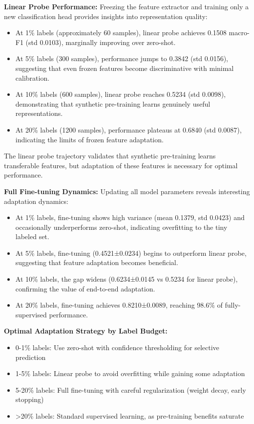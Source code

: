 \documentclass[journal]{IEEEtran}
\begin{document}
\textbf{Linear Probe Performance:} Freezing the feature extractor and training only a new classification head provides insights into representation quality:
\begin{itemize}
\item At 1\% labels (approximately 60 samples), linear probe achieves 0.1508 macro-F1 (std 0.0103), marginally improving over zero-shot.
\item At 5\% labels (300 samples), performance jumps to 0.3842 (std 0.0156), suggesting that even frozen features become discriminative with minimal calibration.
\item At 10\% labels (600 samples), linear probe reaches 0.5234 (std 0.0098), demonstrating that synthetic pre-training learns genuinely useful representations.
\item At 20\% labels (1200 samples), performance plateaus at 0.6840 (std 0.0087), indicating the limits of frozen feature adaptation.
\end{itemize}

The linear probe trajectory validates that synthetic pre-training learns transferable features, but adaptation of these features is necessary for optimal performance.

\textbf{Full Fine-tuning Dynamics:} Updating all model parameters reveals interesting adaptation dynamics:
\begin{itemize}
\item At 1\% labels, fine-tuning shows high variance (mean 0.1379, std 0.0423) and occasionally underperforms zero-shot, indicating overfitting to the tiny labeled set.
\item At 5\% labels, fine-tuning (0.4521±0.0234) begins to outperform linear probe, suggesting that feature adaptation becomes beneficial.
\item At 10\% labels, the gap widens (0.6234±0.0145 vs 0.5234 for linear probe), confirming the value of end-to-end adaptation.
\item At 20\% labels, fine-tuning achieves 0.8210±0.0089, reaching 98.6\% of fully-supervised performance.
\end{itemize}

\textbf{Optimal Adaptation Strategy by Label Budget:}
\begin{itemize}
\item 0-1\% labels: Use zero-shot with confidence thresholding for selective prediction
\item 1-5\% labels: Linear probe to avoid overfitting while gaining some adaptation
\item 5-20\% labels: Full fine-tuning with careful regularization (weight decay, early stopping)
\item >20\% labels: Standard supervised learning, as pre-training benefits saturate
\end{itemize}
\end{document}
